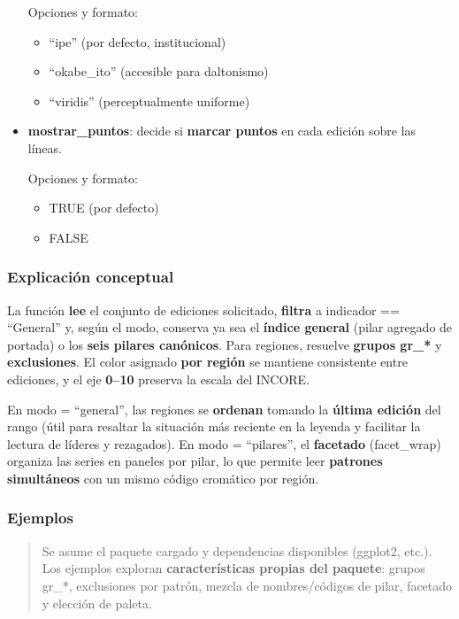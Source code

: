 \documentclass[
  11pt,
  letterpaper,
  DIV=11,
  numbers=noendperiod]{scrartcl}
\begin{document}
\begin{itemize}
  Opciones y formato:

  \begin{itemize}
  \item
    ``ipe'' (por defecto, institucional)
  \item
    ``okabe\_ito'' (accesible para daltonismo)
  \item
    ``viridis'' (perceptualmente uniforme)
  \end{itemize}
\item
  \textbf{mostrar\_puntos}: decide si \textbf{marcar puntos} en cada
  edición sobre las líneas.

  Opciones y formato:

  \begin{itemize}
  \item
    TRUE (por defecto)
  \item
    FALSE
  \end{itemize}
\end{itemize}

\subsubsection{\texorpdfstring{\textbf{Explicación
conceptual}}{Explicación conceptual}}\label{explicaciuxf3n-conceptual-5}

La función \textbf{lee} el conjunto de ediciones solicitado,
\textbf{filtra} a indicador == ``General'' y, según el modo, conserva ya
sea el \textbf{índice general} (pilar agregado de portada) o los
\textbf{seis pilares canónicos}. Para regiones, resuelve \textbf{grupos
gr\_*} y \textbf{exclusiones}. El color asignado \textbf{por región} se
mantiene consistente entre ediciones, y el eje \textbf{0--10} preserva
la escala del INCORE.

En modo = ``general'', las regiones se \textbf{ordenan} tomando la
\textbf{última edición} del rango (útil para resaltar la situación más
reciente en la leyenda y facilitar la lectura de líderes y rezagados).
En modo = ``pilares'', el \textbf{facetado} (facet\_wrap) organiza las
series en paneles por pilar, lo que permite leer \textbf{patrones
simultáneos} con un mismo código cromático por región.

\subsubsection{\texorpdfstring{\textbf{Ejemplos}}{Ejemplos}}\label{ejemplos-5}

\begin{quote}
Se asume el paquete cargado y dependencias disponibles (ggplot2, etc.).
Los ejemplos exploran \textbf{características propias del paquete}:
grupos gr\_*, exclusiones por patrón, mezcla de nombres/códigos de
pilar, facetado y elección de paleta.
\end{quote}
\end{document}
